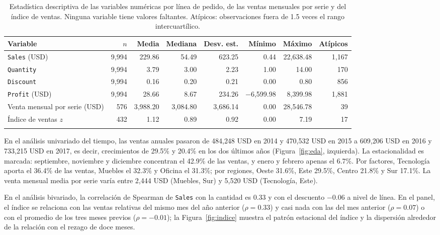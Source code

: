 \documentclass[pdflatex,sn-mathphys-num]{sn-jnl}
\begin{document}
\begin{table}[!htb]
\caption{Estadística descriptiva de las variables numéricas por línea de pedido, de las ventas mensuales por serie y del índice de ventas. Ninguna variable tiene valores faltantes. Atípicos: observaciones fuera de 1.5 veces el rango intercuartílico.}\label{tab:eda}
\footnotesize
\begin{tabular*}{\textwidth}{@{\extracolsep\fill}lrrrrrrr}
\toprule
Variable & $n$ & Media & Mediana & Desv. est. & Mínimo & Máximo & Atípicos \\
\midrule
\texttt{Sales} (USD) & 9{,}994 & 229.86 & 54.49 & 623.25 & 0.44 & 22{,}638.48 & 1{,}167 \\
\texttt{Quantity} & 9{,}994 & 3.79 & 3.00 & 2.23 & 1.00 & 14.00 & 170 \\
\texttt{Discount} & 9{,}994 & 0.16 & 0.20 & 0.21 & 0.00 & 0.80 & 856 \\
\texttt{Profit} (USD) & 9{,}994 & 28.66 & 8.67 & 234.26 & $-$6{,}599.98 & 8{,}399.98 & 1{,}881 \\
Venta mensual por serie (USD) & 576 & 3{,}988.20 & 3{,}084.80 & 3{,}686.14 & 0.00 & 28{,}546.78 & 39 \\
Índice de ventas $z$ & 432 & 1.12 & 0.89 & 0.92 & 0.00 & 7.19 & 17 \\
\botrule
\end{tabular*}
\end{table}

En el análisis univariado del tiempo, las ventas anuales pasaron de 484{,}248 USD en 2014 y 470{,}532 USD en 2015 a 609{,}206 USD en 2016 y 733{,}215 USD en 2017, es decir, crecimientos de 29.5\% y 20.4\% en los dos últimos años (Figura~\ref{fig:eda}, izquierda). La estacionalidad es marcada: septiembre, noviembre y diciembre concentran el 42.9\% de las ventas, y enero y febrero apenas el 6.7\%. Por factores, Tecnología aporta el 36.4\% de las ventas, Muebles el 32.3\% y Oficina el 31.3\%; por regiones, Oeste 31.6\%, Este 29.5\%, Centro 21.8\% y Sur 17.1\%. La venta mensual media por serie varía entre 2{,}444 USD (Muebles, Sur) y 5{,}520 USD (Tecnología, Este).

En el análisis bivariado, la correlación de Spearman de \texttt{Sales} con la cantidad es 0.33 y con el descuento $-0.06$ a nivel de línea. En el panel, el índice se relaciona con las ventas relativas del mismo mes del año anterior ($\rho=0.33$) y casi nada con las del mes anterior ($\rho=0.07$) o con el promedio de los tres meses previos ($\rho=-0.01$); la Figura~\ref{fig:indice} muestra el patrón estacional del índice y la dispersión alrededor de la relación con el rezago de doce meses.
\end{document}
